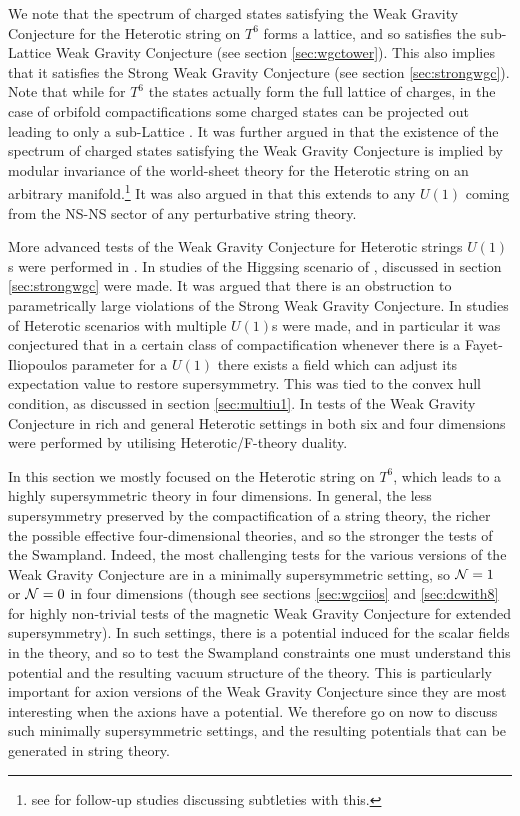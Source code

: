 \documentclass[11pt,a4paper]{article}
\numberwithin{equation}{section}
\numberwithin{table}{section}\setlength{\multlinegap}{25pt}
\begin{document}
We note that the spectrum of charged states satisfying the Weak Gravity Conjecture for the Heterotic string on $T^6$ forms a lattice, and so satisfies the sub-Lattice Weak Gravity Conjecture (see section \ref{sec:wgctower}). This also implies that it satisfies the Strong Weak Gravity Conjecture (see section \ref{sec:strongwgc}). Note that while for $T^6$ the states actually form the full lattice of charges, in the case of orbifold compactifications some charged states can be projected out leading to only a sub-Lattice \cite{Heidenreich:2016aqi,Brown:2015lia}. It was further argued in \cite{ArkaniHamed:2006dz} that the existence of the spectrum of charged states satisfying the Weak Gravity Conjecture is implied by modular invariance of the world-sheet theory for the Heterotic string on an arbitrary manifold.\footnote{see \cite{Heidenreich:2016aqi,Montero:2016tif} for follow-up studies discussing subtleties with this.} It was also argued in \cite{Heidenreich:2016aqi} that this extends to any $U(1)$ coming from the NS-NS sector of any perturbative string theory.  

More advanced tests of the Weak Gravity Conjecture for Heterotic strings $U(1)$s were performed in \cite{Ibanez:2017vfl,Aldazabal:2018nsj}. In \cite{Ibanez:2017vfl} studies of the Higgsing scenario of \cite{Saraswat:2016eaz}, discussed in section \ref{sec:strongwgc} were made. It was argued that there is an obstruction to parametrically large violations of the Strong Weak Gravity Conjecture. In \cite{Aldazabal:2018nsj} studies of Heterotic scenarios with multiple $U(1)$s were made, and in particular it was conjectured that in a certain class of compactification whenever there is a Fayet-Iliopoulos parameter for a $U(1)$ there exists a field which can adjust its expectation value to restore supersymmetry. This was tied to the convex hull condition, as discussed in section \ref{sec:multiu1}. In \cite{Lee:2018urn,Lee:2018spm,Lee:2019tst} tests of the Weak Gravity Conjecture in rich and general Heterotic settings in both six and four dimensions were performed by utilising Heterotic/F-theory duality. 

In this section we mostly focused on the Heterotic string on $T^6$, which leads to a highly supersymmetric theory in four dimensions. In general, the less supersymmetry preserved by the compactification of a string theory, the richer the possible effective four-dimensional theories, and so the stronger the tests of the Swampland. Indeed, the most challenging tests for the various versions of the Weak Gravity Conjecture are in a minimally supersymmetric setting, so ${\cal N}=1$ or ${\cal N}=0$ in four dimensions (though see sections \ref{sec:wgciios} and \ref{sec:dcwith8} for highly non-trivial tests of the magnetic Weak Gravity Conjecture for extended supersymmetry). In such settings, there is a potential induced for the scalar fields in the theory, and so to test the Swampland constraints one must understand this potential and the resulting vacuum structure of the theory. This is particularly important for axion versions of the Weak Gravity Conjecture since they are most interesting when the axions have a potential. We therefore go on now to discuss such minimally supersymmetric settings, and the resulting potentials that can be generated in string theory. 
\end{document}
